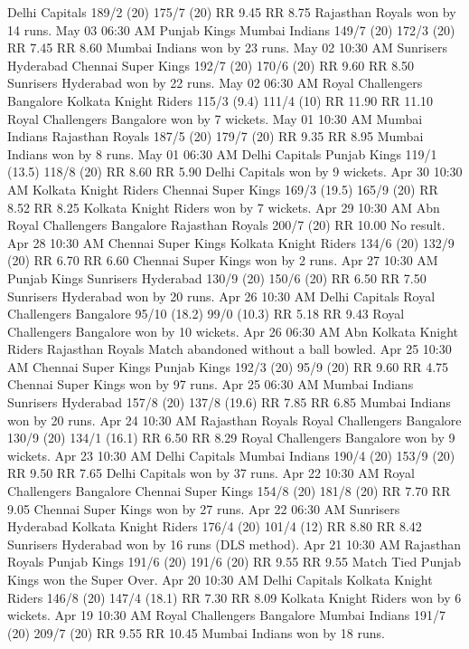 Delhi Capitals
189/2 (20)
175/7 (20)
RR 9.45
RR 8.75
Rajasthan Royals won by 14 runs.
May 03
06:30 AM
Punjab Kings
Mumbai Indians
149/7 (20)
172/3 (20)
RR 7.45
RR 8.60
Mumbai Indians won by 23 runs.
May 02
10:30 AM
Sunrisers Hyderabad
Chennai Super Kings
192/7 (20)
170/6 (20)
RR 9.60
RR 8.50
Sunrisers Hyderabad won by 22 runs.
May 02
06:30 AM
Royal Challengers Bangalore
Kolkata Knight Riders
115/3 (9.4)
111/4 (10)
RR 11.90
RR 11.10
Royal Challengers Bangalore won by 7 wickets.
May 01
10:30 AM
Mumbai Indians
Rajasthan Royals
187/5 (20)
179/7 (20)
RR 9.35
RR 8.95
Mumbai Indians won by 8 runs.
May 01
06:30 AM
Delhi Capitals
Punjab Kings
119/1 (13.5)
118/8 (20)
RR 8.60
RR 5.90
Delhi Capitals won by 9 wickets.
Apr 30
10:30 AM
Kolkata Knight Riders
Chennai Super Kings
169/3 (19.5)
165/9 (20)
RR 8.52
RR 8.25
Kolkata Knight Riders won by 7 wickets.
Apr 29
10:30 AM
Abn
Royal Challengers Bangalore
Rajasthan Royals
200/7 (20)
RR 10.00
No result.
Apr 28
10:30 AM
Chennai Super Kings
Kolkata Knight Riders
134/6 (20)
132/9 (20)
RR 6.70
RR 6.60
Chennai Super Kings won by 2 runs.
Apr 27
10:30 AM
Punjab Kings
Sunrisers Hyderabad
130/9 (20)
150/6 (20)
RR 6.50
RR 7.50
Sunrisers Hyderabad won by 20 runs.
Apr 26
10:30 AM
Delhi Capitals
Royal Challengers Bangalore
95/10 (18.2)
99/0 (10.3)
RR 5.18
RR 9.43
Royal Challengers Bangalore won by 10 wickets.
Apr 26
06:30 AM
Abn
Kolkata Knight Riders
Rajasthan Royals
Match abandoned without a ball bowled.
Apr 25
10:30 AM
Chennai Super Kings
Punjab Kings
192/3 (20)
95/9 (20)
RR 9.60
RR 4.75
Chennai Super Kings won by 97 runs.
Apr 25
06:30 AM
Mumbai Indians
Sunrisers Hyderabad
157/8 (20)
137/8 (19.6)
RR 7.85
RR 6.85
Mumbai Indians won by 20 runs.
Apr 24
10:30 AM
Rajasthan Royals
Royal Challengers Bangalore
130/9 (20)
134/1 (16.1)
RR 6.50
RR 8.29
Royal Challengers Bangalore won by 9 wickets.
Apr 23
10:30 AM
Delhi Capitals
Mumbai Indians
190/4 (20)
153/9 (20)
RR 9.50
RR 7.65
Delhi Capitals won by 37 runs.
Apr 22
10:30 AM
Royal Challengers Bangalore
Chennai Super Kings
154/8 (20)
181/8 (20)
RR 7.70
RR 9.05
Chennai Super Kings won by 27 runs.
Apr 22
06:30 AM
Sunrisers Hyderabad
Kolkata Knight Riders
176/4 (20)
101/4 (12)
RR 8.80
RR 8.42
Sunrisers Hyderabad won by 16 runs (DLS method).
Apr 21
10:30 AM
Rajasthan Royals
Punjab Kings
191/6 (20)
191/6 (20)
RR 9.55
RR 9.55
Match Tied Punjab Kings won the Super Over.
Apr 20
10:30 AM
Delhi Capitals
Kolkata Knight Riders
146/8 (20)
147/4 (18.1)
RR 7.30
RR 8.09
Kolkata Knight Riders won by 6 wickets.
Apr 19
10:30 AM
Royal Challengers Bangalore
Mumbai Indians
191/7 (20)
209/7 (20)
RR 9.55
RR 10.45
Mumbai Indians won by 18 runs.
